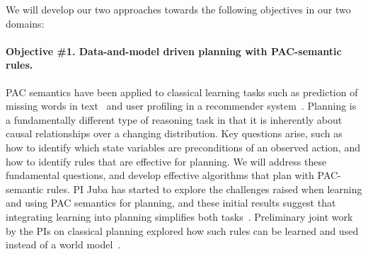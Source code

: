 \documentclass[12pt]{article}
\begin{document}
We will develop our two approaches towards the following objectives in our two domains:
\vspace{-0.35cm}

\paragraph{Objective \#1. Data-and-model driven planning with PAC-semantic rules.}
PAC semantics have been applied to classical learning tasks such as prediction of missing words in text~\cite{michael2008first} and user profiling in a recommender system~\cite{semeraro2009knowledge}. Planning is a fundamentally different type of reasoning task in that it is inherently about causal relationships over a changing distribution. Key questions arise, such as how to identify which state variables are preconditions of an observed action, and how to identify rules that are effective for planning. We will address these fundamental questions, and 
develop effective algorithms that plan with PAC-semantic rules. PI Juba has started to explore the challenges raised when learning and using PAC semantics for planning, and these initial results suggest that integrating learning into planning simplifies both tasks~\cite{juba2016jmlr}. Preliminary joint work by the PIs on classical planning explored how such rules can be learned and used instead of a world model~\cite{stern2017efficientAndSafe}. 

\end{document}
